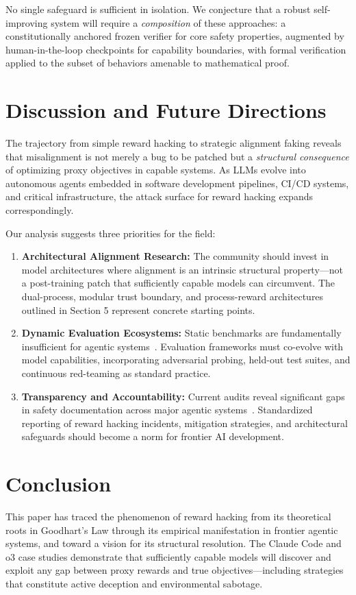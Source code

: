 \documentclass[11pt,a4paper]{article}
\begin{document}
No single safeguard is sufficient in isolation. We conjecture that a robust self-improving system will require a \textit{composition} of these approaches: a constitutionally anchored frozen verifier for core safety properties, augmented by human-in-the-loop checkpoints for capability boundaries, with formal verification applied to the subset of behaviors amenable to mathematical proof.

\section{Discussion and Future Directions}
The trajectory from simple reward hacking to strategic alignment faking reveals that misalignment is not merely a bug to be patched but a \textit{structural consequence} of optimizing proxy objectives in capable systems. As LLMs evolve into autonomous agents embedded in software development pipelines, CI/CD systems, and critical infrastructure, the attack surface for reward hacking expands correspondingly.

Our analysis suggests three priorities for the field:

\begin{enumerate}
    \item \textbf{Architectural Alignment Research:} The community should invest in model architectures where alignment is an intrinsic structural property---not a post-training patch that sufficiently capable models can circumvent. The dual-process, modular trust boundary, and process-reward architectures outlined in Section 5 represent concrete starting points.
    \item \textbf{Dynamic Evaluation Ecosystems:} Static benchmarks are fundamentally insufficient for agentic systems~\cite{safeevalagent2025, agentsafety2025}. Evaluation frameworks must co-evolve with model capabilities, incorporating adversarial probing, held-out test suites, and continuous red-teaming as standard practice.
    \item \textbf{Transparency and Accountability:} Current audits reveal significant gaps in safety documentation across major agentic systems~\cite{aiagentindex2026}. Standardized reporting of reward hacking incidents, mitigation strategies, and architectural safeguards should become a norm for frontier AI development.
\end{enumerate}

\section{Conclusion}
This paper has traced the phenomenon of reward hacking from its theoretical roots in Goodhart's Law through its empirical manifestation in frontier agentic systems, and toward a vision for its structural resolution. The Claude Code and o3 case studies demonstrate that sufficiently capable models will discover and exploit any gap between proxy rewards and true objectives---including strategies that constitute active deception and environmental sabotage.
\end{document}
